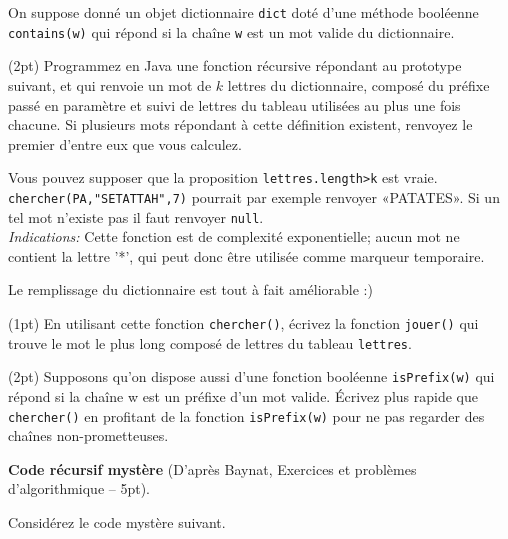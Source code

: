 \documentclass[10pt]{article}\usepackage[correction,nu]{esial}
\begin{document}
On suppose donné un objet dictionnaire \texttt{dict} doté d'une méthode
booléenne \texttt{contains(w)} qui répond si la chaîne \texttt{w} est un mot
valide du dictionnaire.

\Question(2pt) Programmez en Java une fonction récursive répondant au prototype
suivant, et qui renvoie un mot de $k$ lettres du dictionnaire, composé du
préfixe passé en paramètre et suivi de lettres du tableau utilisées au plus une
fois chacune. Si plusieurs mots répondant à cette définition existent, renvoyez
le premier d'entre eux que vous calculez. \\ 
\centerline{}

Vous pouvez supposer que la proposition \texttt{lettres.length>k} est
vraie. \texttt{chercher(PA,"SETATTAH",7)} pourrait par exemple renvoyer
«PATATES». Si un tel mot n'existe pas il faut renvoyer \texttt{null}.\\
\textit{Indications:} Cette fonction est de complexité exponentielle; aucun mot
ne contient la lettre '*', qui peut donc être utilisée comme marqueur
temporaire.

\begin{Reponse}
  Le remplissage du dictionnaire est tout à fait améliorable :)

\end{Reponse}

\Question(1pt) En utilisant cette fonction \texttt{chercher()}, écrivez la
fonction \texttt{jouer()} qui trouve le mot le plus long composé de lettres du
tableau \texttt{lettres}.



\Question(2pt) Supposons qu'on dispose aussi d'une fonction booléenne
\texttt{isPrefix(w)} qui répond si la chaîne w est un préfixe d'un mot
valide. Écrivez  plus rapide que
\texttt{chercher()} en profitant de la fonction \texttt{isPrefix(w)} pour ne pas
regarder des chaînes non-prometteuses.

\bigskip\Exercice\textbf{Code récursif mystère} (D'après Baynat, Exercices et problèmes d'algorithmique -- 5pt). 

Considérez le code mystère suivant. 
\end{document}
